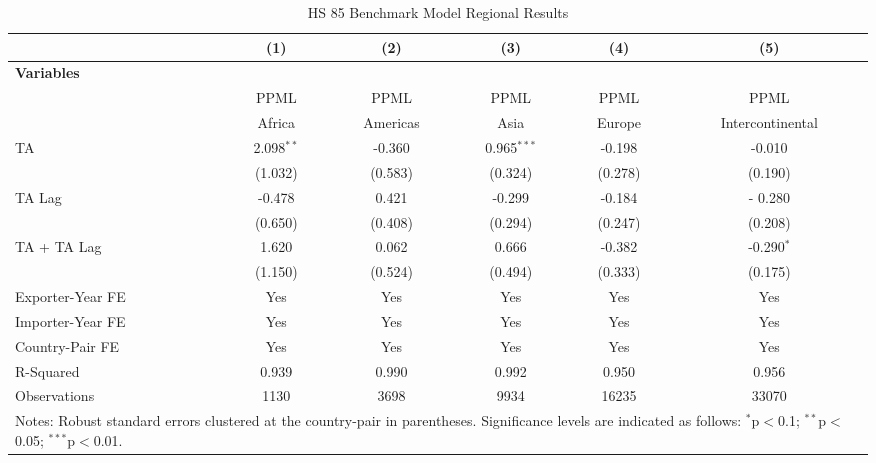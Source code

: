 \begin{table}[htbp]
    \centering
    \caption{HS 85 Benchmark Model Regional Results}
    \label{tab:85_benchmark_region_analysis} %
    \begin{adjustbox}{max width=\textwidth}
    \begin{tabular}{l@{\extracolsep{1pt}}ccccc}
    \hline
    & \multicolumn{1}{c}{(1)} & \multicolumn{1}{c}{(2)} & \multicolumn{1}{c}{(3)} & \multicolumn{1}{c}{(4)} & \multicolumn{1}{c}{(5)} \\
    \hline
    \textbf{Variables} &  &  &  &  &  \\
    \hline
     & PPML & PPML & PPML & PPML & PPML \\
     & Africa & Americas & Asia & Europe & Intercontinental \\
    \hline
    TA & 2.098$^{\ast\ast}$ & -0.360 & 0.965$^{\ast\ast\ast}$ & -0.198 & -0.010 \\
    & (1.032) & (0.583) & (0.324) & (0.278) & (0.190) \\

    TA Lag & -0.478 & 0.421 & -0.299 & -0.184 &- 0.280 \\
    & (0.650) & (0.408) & (0.294) & (0.247) & (0.208) \\

    TA + TA Lag & 1.620 & 0.062 & 0.666 & -0.382 & -0.290$^{\ast}$ \\
    & (1.150) & (0.524) & (0.494) & (0.333) & (0.175) \\
    \hline
    Exporter-Year FE & Yes & Yes & Yes & Yes & Yes \\
    Importer-Year FE & Yes & Yes & Yes & Yes & Yes \\
    Country-Pair FE & Yes & Yes & Yes & Yes & Yes \\
    R-Squared & 0.939 & 0.990 & 0.992 & 0.950 & 0.956 \\
    Observations & 1130 & 3698 & 9934 & 16235 & 33070 \\
    \hline
    \multicolumn{6}{l}{\footnotesize{Notes: Robust standard errors clustered at the country-pair in parentheses. Significance levels are indicated as follows: $^{\ast}$p$<$0.1; $^{\ast\ast}$p$<$0.05; $^{\ast\ast\ast}$p$<$0.01.}} \\
    \end{tabular}
    \end{adjustbox}
\end{table}
